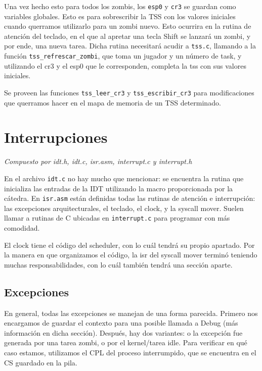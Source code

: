 \documentclass{article}
\begin{document}
	Una vez hecho esto para todos los zombis, los \texttt{esp0} y \texttt{cr3} se guardan como variables globales. Esto es para sobrescribir la TSS con los valores iniciales cuando querramos utilizarlo para un zombi nuevo. Esto ocurrira en la rutina de atención del teclado, en el que al apretar una tecla Shift se lanzará un zombi, y por ende, una nueva tarea. Dicha rutina necesitará acudir a \texttt{tss.c}, llamando a la función \texttt{tss\_refrescar\_zombi}, que toma un jugador y un número de task, y utilizando el cr3 y el esp0 que le corresponden, completa la tss con sus valores iniciales.
	
	Se proveen las funciones \texttt{tss\_leer\_cr3} y \texttt{tss\_escribir\_cr3} para modificaciones que querramos hacer en el mapa de memoria de un TSS determinado.
	
	
	\section{Interrupciones}
	\vspace{-1cm}	
	\begin{flushright}
	\textit{Compuesto por idt.h, idt.c, isr.asm, interrupt.c y interrupt.h}
	\end{flushright}
	
	En el archivo \texttt{idt.c} no hay mucho que mencionar: se encuentra la rutina que inicializa las entradas de la IDT utilizando la macro proporcionada por la cátedra. En \texttt{isr.asm} están definidas todas las rutinas de atención e interrupción: las excepciones arquitecturales, el teclado, el clock, y la syscall mover. Suelen llamar a rutinas de C ubicadas en \texttt{interrupt.c} para programar con más comodidad.
	
	El clock tiene el código del scheduler, con lo cuál tendrá su propio apartado. Por la manera en que organizamos el código, la isr del syscall mover terminó teniendo muchas responsabilidades, con lo cuál también tendrá una sección aparte.
	
	\subsection*{Excepciones}
	
	En general, todas las excepciones se manejan de una forma parecida. Primero nos encargamos de guardar el contexto para una posible llamada a Debug (más información en dicha sección). Después, hay dos variantes: o la excepción fue generada por una tarea zombi, o por el kernel/tarea idle. Para verificar en qué caso estamos, utilizamos el CPL del proceso interrumpido, que se encuentra en el CS guardado en la pila.
	
\end{document}
